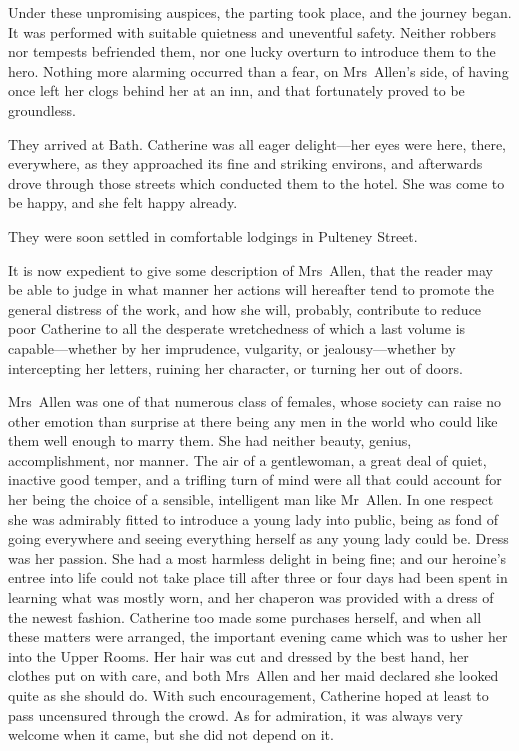  Under these unpromising auspices, the parting took place, and the journey began. It was performed with suitable quietness and uneventful safety. Neither robbers nor tempests befriended them, nor one lucky overturn to introduce them to the hero. Nothing more alarming occurred than a fear, on Mrs~Allen's side, of having once left her clogs behind her at an inn, and that fortunately proved to be groundless. 

 They arrived at Bath. Catherine was all eager delight—her eyes were here, there, everywhere, as they approached its fine and striking environs, and afterwards drove through those streets which conducted them to the hotel. She was come to be happy, and she felt happy already. 

 They were soon settled in comfortable lodgings in Pulteney Street. 

 It is now expedient to give some description of Mrs~Allen, that the reader may be able to judge in what manner her actions will hereafter tend to promote the general distress of the work, and how she will, probably, contribute to reduce poor Catherine to all the desperate wretchedness of which a last volume is capable—whether by her imprudence, vulgarity, or jealousy—whether by intercepting her letters, ruining her character, or turning her out of doors. 

 Mrs~Allen was one of that numerous class of females, whose society can raise no other emotion than surprise at there being any men in the world who could like them well enough to marry them. She had neither beauty, genius, accomplishment, nor manner. The air of a gentlewoman, a great deal of quiet, inactive good temper, and a trifling turn of mind were all that could account for her being the choice of a sensible, intelligent man like Mr~Allen. In one respect she was admirably fitted to introduce a young lady into public, being as fond of going everywhere and seeing everything herself as any young lady could be. Dress was her passion. She had a most harmless delight in being fine; and our heroine's entree into life could not take place till after three or four days had been spent in learning what was mostly worn, and her chaperon was provided with a dress of the newest fashion. Catherine too made some purchases herself, and when all these matters were arranged, the important evening came which was to usher her into the Upper Rooms. Her hair was cut and dressed by the best hand, her clothes put on with care, and both Mrs~Allen and her maid declared she looked quite as she should do. With such encouragement, Catherine hoped at least to pass uncensured through the crowd. As for admiration, it was always very welcome when it came, but she did not depend on it. 


